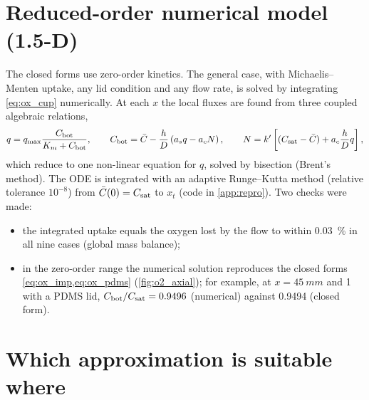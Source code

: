 \section{Reduced-order numerical model (1.5-D)}
\label{sec:ox_numerical}

The closed forms use zero-order kinetics. The general case, with Michaelis--Menten uptake, any lid condition and any flow rate, is solved by integrating \cref{eq:ox_cup} numerically. At each $x$ the local fluxes are found from three coupled algebraic relations,
\begin{equation}
q=q_{\max}\frac{C_{\mathrm{bot}}}{K_{m}+C_{\mathrm{bot}}},\qquad
C_{\mathrm{bot}}=\bar C-\frac hD\left(a_sq-a_cN\right),\qquad
N=k'\left[(C_{\mathrm{sat}}-\bar C)+a_c\frac hDq\right],
\end{equation}
which reduce to one non-linear equation for $q$, solved by bisection (Brent's method). The ODE is integrated with an adaptive Runge--Kutta method (relative tolerance $10^{-8}$) from $\bar C(0)=C_{\mathrm{sat}}$ to $x_t$ (code in \cref{app:repro}). Two checks were made:
\begin{itemize}
\item the integrated uptake equals the oxygen lost by the flow to within \SI{0.03}{\percent} in all nine cases (global mass balance);
\item in the zero-order range the numerical solution reproduces the closed forms \cref{eq:ox_imp,eq:ox_pdms} (\cref{fig:o2_axial}); for example, at $x=\SI{45}{mm}$ and \SI{1}{\uLmin} with a PDMS lid, $C_{\mathrm{bot}}/C_{\mathrm{sat}}=0.9496$ (numerical) against 0.9494 (closed form).
\end{itemize}

\section{Which approximation is suitable where}
\label{sec:ox_choice}

